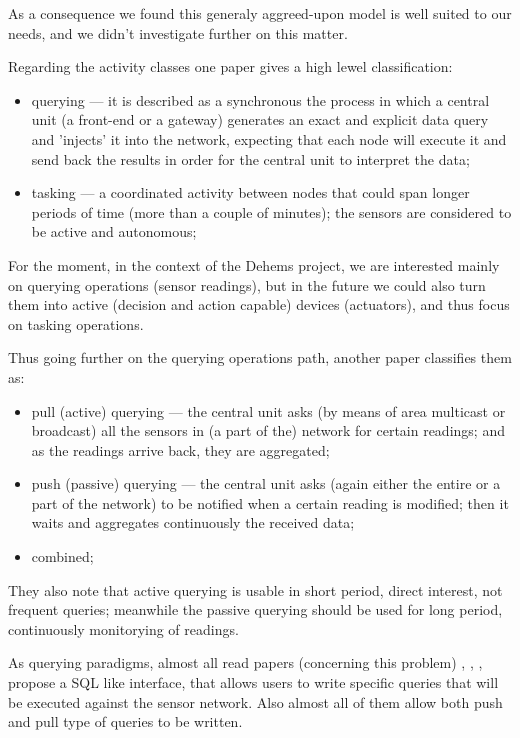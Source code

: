 As a consequence we found this generaly aggreed-upon model is well suited to our needs, and we didn't investigate further on this matter.

Regarding the activity classes one paper \cite{Jaikaeo2000} gives a high lewel classification:
\begin{itemize}
	\item querying --- it is described as a synchronous the process in which a central unit (a front-end or a gateway) generates an exact and explicit data query and 'injects' it into the network, expecting that each node will execute it and send back the results in order for the central unit to interpret the data;
	\item tasking --- a coordinated activity between nodes that could span longer periods of time (more than a couple of minutes); the sensors are considered to be active and autonomous;
\end{itemize}

For the moment, in the context of the Dehems project, we are interested mainly on querying operations (sensor readings), but in the future we could also turn them into active (decision and action capable) devices (actuators), and thus focus on tasking operations.

Thus going further on the querying operations path, another paper \cite{Shi2004} classifies them as:

\begin{itemize}
	\item pull (active) querying --- the central unit asks (by means of area multicast or broadcast) all the sensors in (a part of the) network for certain readings; and as the readings arrive back, they are aggregated;
	\item push (passive) querying --- the central unit asks (again either the entire or a part of the network) to be notified when a certain reading is modified; then it waits and aggregates continuously the received data;
	\item combined;
\end{itemize}

They also note that active querying is usable in short period, direct interest, not frequent queries; meanwhile the passive querying should be used for long period, continuously monitorying of readings.

As querying paradigms, almost all read papers (concerning this problem) \cite{Woo2004}, \cite{Shi2004}, \cite{Jaikaeo2000}, \cite{Gehrke2003} propose a SQL like interface, that allows users to write specific queries that will be executed against the sensor network. Also almost all of them allow both push and pull type of queries to be written.

